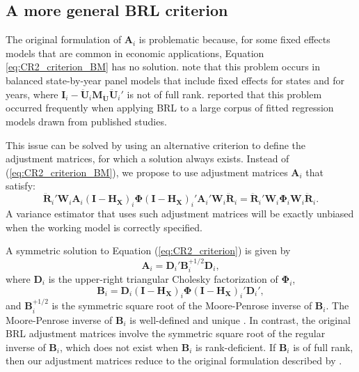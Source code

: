 \documentclass[12pt]{article}\usepackage[]{graphicx}\usepackage[]{color}
\newcommand{\bm}{\mathbf}
\newcommand{\bs}{\boldsymbol}
\begin{document}
\subsection{A more general BRL criterion}

The original formulation of $\bm{A}_i$ is problematic because, for some fixed effects models that are common in economic applications, Equation \ref{eq:CR2_criterion_BM} has no solution. 
\citet{Angrist2009mostly} note that this problem occurs in balanced state-by-year panel models that include fixed effects for states and for years, where $\bm{I}_i - \bm{\ddot{U}}_i \bm{M_{\ddot{U}}} \bm{\ddot{U}}_i'$ is not of full rank. 
\citet{Young2016improved} reported that this problem occurred frequently when applying BRL to a large corpus of fitted regression models drawn from published studies.

This issue can be solved by using an alternative criterion to define the adjustment matrices, for which a solution always exists. 
Instead of (\ref{eq:CR2_criterion_BM}), we propose to use adjustment matrices $\bm{A}_i$ that satisfy:
\begin{equation}
\label{eq:CR2_criterion}
\bm{\ddot{R}}_i' \bm{W}_i \bm{A}_i \left(\bm{I} - \bm{H_X}\right)_i \bs\Phi \left(\bm{I} - \bm{H_X}\right)_i' \bm{A}_i' \bm{W}_i \bm{\ddot{R}}_i = \bm{\ddot{R}}_i' \bm{W}_i \bs\Phi_i \bm{W}_i \bm{\ddot{R}}_i.
\end{equation}
A variance estimator that uses such adjustment matrices will be exactly unbiased when the working model is correctly specified.

A symmetric solution to Equation (\ref{eq:CR2_criterion}) is given by
\begin{equation}
\label{eq:CR2_adjustment}
\bm{A}_i = \bm{D}_i' \bm{B}_i^{+1/2} \bm{D}_i,
\end{equation}
where $\bm{D}_i$ is the upper-right triangular Cholesky factorization of $\bs\Phi_i$, 
\begin{equation}
\label{eq:CR2_Bmatrix}
\bm{B}_i = \bm{D}_i\left(\bm{I} - \bm{H_X}\right)_i \bs\Phi \left(\bm{I} - \bm{H_X}\right)_i' \bm{D}_i',
\end{equation}
and $\bm{B}_i^{+1/2}$ is the symmetric square root of the Moore-Penrose inverse of $\bm{B}_i$. 
The Moore-Penrose inverse of $\bm{B}_i$ is well-defined and unique \citep[][Thm. 9.18]{Banerjee2014linear}. 
In contrast, the original BRL adjustment matrices involve the symmetric square root of the regular inverse of $\bm{B}_i$, which does not exist when $\bm{B}_i$ is rank-deficient. If $\bm{B}_i$ is of full rank, then our adjustment matrices reduce to the original formulation described by \citet{Bell2002bias}. 
\end{document}
